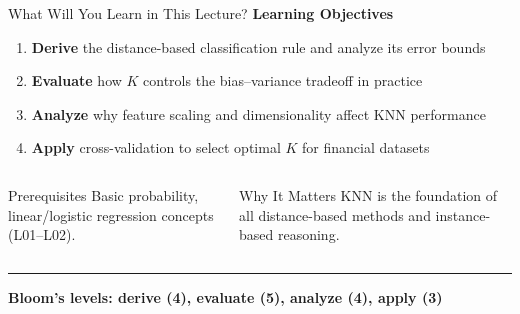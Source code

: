 \documentclass[8pt,aspectratio=169]{beamer}
\newcommand{\bottomnote}[1]{%
\vfill
\vspace{-2mm}
\textcolor{mllavender2}{\rule{\textwidth}{0.4pt}}
\vspace{1mm}
\footnotesize
\textbf{#1}
}
\newcommand{\highlight}[1]{\textcolor{mlorange}{\textbf{#1}}}
\begin{document}
\begin{frame}[t]{What Will You Learn in This Lecture?}
\small
\textbf{Learning Objectives}
\begin{enumerate}
\item \footnotesize \highlight{Derive} the distance-based classification rule and analyze its error bounds
\item \footnotesize \highlight{Evaluate} how $K$ controls the bias--variance tradeoff in practice
\item \footnotesize \highlight{Analyze} why feature scaling and dimensionality affect KNN performance
\item \footnotesize \highlight{Apply} cross-validation to select optimal $K$ for financial datasets
\end{enumerate}

\vspace{4mm}
\begin{columns}[T]
\begin{block}{Prerequisites}
\footnotesize Basic probability, linear/logistic regression concepts (L01--L02).
\end{block}

\begin{block}{Why It Matters}
\footnotesize KNN is the foundation of all distance-based methods and instance-based reasoning.
\end{block}
\end{columns}
\bottomnote{Bloom's levels: derive (4), evaluate (5), analyze (4), apply (3)}
\end{frame}
\end{document}
